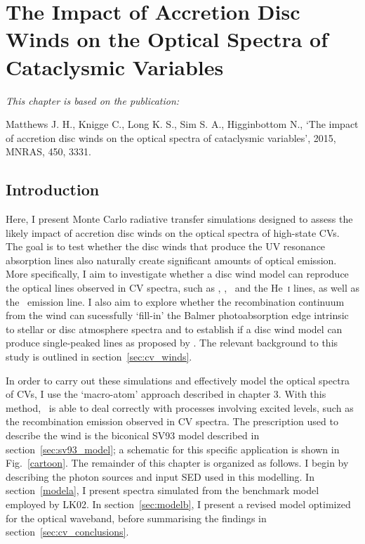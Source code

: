 %
%


\chapter{The Impact of Accretion Disc Winds on the Optical Spectra of Cataclysmic Variables}

{\em This chapter is based on the publication:

Matthews J. H., Knigge C., Long K. S., Sim S. A., Higginbottom N., 
`The impact of accretion disc winds on the optical spectra of 
cataclysmic variables',
2015, MNRAS, 450, 3331.}
%
%

\section{Introduction} 
\label{sec:intro} 

\nocite{groot2004}
\nocite{beuermann1990}
\nocite{beuermann1992}
\nocite{higginbottom2013}

Here, I present Monte Carlo radiative transfer simulations designed
to assess the likely impact of accretion disc winds on the
optical spectra of high-state CVs. The goal is to
test whether the disc winds that produce the UV
resonance absorption lines also naturally create significant amounts of  
optical emission. More specifically, I aim to investigate whether a 
disc wind model can reproduce the optical lines observed in CV spectra,
such as \ha, \hb, \heiiopt\ and the He~\textsc{i} lines, as well as
the \heiiuv\ emission line. I also aim to explore whether the recombination
continuum from the wind can sucessfully `fill-in' the Balmer photoabsorption
edge intrinsic to stellar or disc atmosphere spectra and to establish
if a disc wind model can produce single-peaked lines as proposed
by \citet[][hereafter referred to collectively as MC96]{MC96,MC97}.
The relevant background to this study is outlined in section~\ref{sec:cv_winds}.

In order to carry out these simulations and effectively model the optical
spectra of CVs, I use the `macro-atom' approach described in chapter 3. 
With this method, \py\ is able to deal correctly with processes involving
excited levels, such as the recombination emission observed in CV spectra.
The prescription used to describe the wind is the biconical SV93 model described in 
section~\ref{sec:sv93_model}; a schematic for this specific application
is shown in Fig.~\ref{cartoon}. 
The remainder of this chapter is organized as follows. I begin
by describing the photon sources and input SED used in this modelling.
In section~\ref{modela}, I present spectra simulated from the benchmark 
model employed by LK02. In section~\ref{sec:modelb}, I present a revised model
optimized for the optical waveband, before summarising the
findings in section~\ref{sec:cv_conclusions}.


